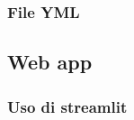         \subsubsection{File YML}

    \subsection{Web app}

        \subsubsection{Uso di streamlit}
